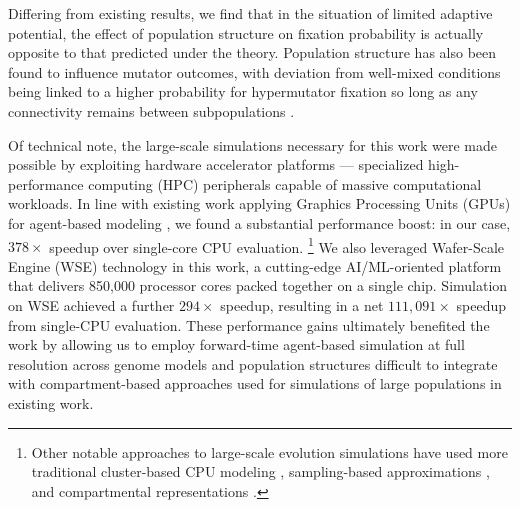 Differing from existing results, we find that in the situation of limited adaptive potential, the effect of population structure on fixation probability is actually opposite to that predicted under the theory.
Population structure has also been found to influence mutator outcomes, with deviation from well-mixed conditions being linked to a higher probability for hypermutator fixation so long as any connectivity remains between subpopulations \citep{raynes2019migration}.

Of technical note, the large-scale simulations necessary for this work were made possible by exploiting hardware accelerator platforms --- specialized high-performance computing (HPC) peripherals capable of massive computational workloads.
In line with existing work applying Graphics Processing Units (GPUs) for agent-based modeling \citep{turpin2021xaevol,kosiachenko2019mass,perumalla2009switching,heinemann2007artificial,richmond2023flame}, we found a substantial performance boost: in our case, $378\times$ speedup over single-core CPU evaluation.
\footnote{%
Other notable approaches to large-scale evolution simulations have used more traditional cluster-based CPU modeling \citep{moreno2022best,collier2015large,ray1995proposal,turpin2020paevol}, sampling-based approximations \citep{taddei1997role}, and compartmental representations \citep{tenaillon1999mutators}.}
We also leveraged Wafer-Scale Engine (WSE) technology in this work, a cutting-edge AI/ML-oriented platform that delivers 850,000 processor cores packed together on a single chip.
Simulation on WSE achieved a further $294\times$ speedup, resulting in a net $111{,}091\times$ speedup from single-CPU evaluation.
These performance gains ultimately benefited the work by allowing us to employ forward-time agent-based simulation at full resolution across genome models and population structures difficult to integrate with compartment-based approaches used for simulations of large populations in existing work.

